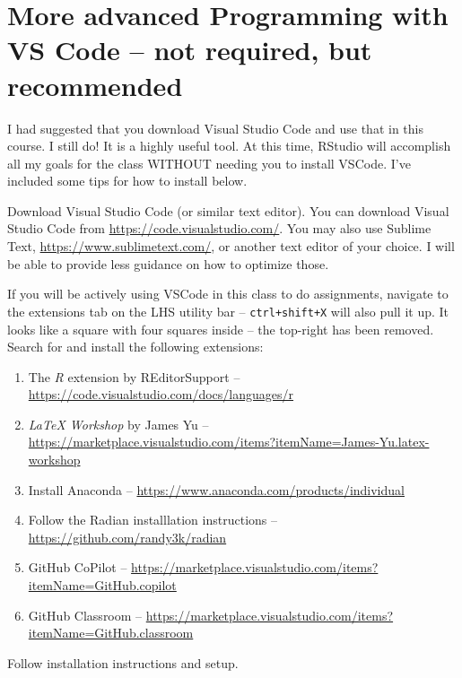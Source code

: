 \documentclass[12pt,english]{exam}
\begin{document}
\section{More advanced Programming with VS Code -- not required, but recommended}

I had suggested that you download Visual Studio Code and use that in this course. I still do! It is a highly useful tool. At this time, RStudio will accomplish all my goals for the class WITHOUT needing you to install VSCode. I've included some tips for how to install below. 

Download Visual Studio Code (or similar text editor). You can download Visual Studio Code from \url{https://code.visualstudio.com/}. You may also use Sublime Text, \url{https://www.sublimetext.com/}, or another text editor of your choice. I will be able to provide less guidance on how to optimize those. 

If you will be actively using VSCode in this class to do assignments, navigate to the extensions tab on the LHS utility bar -- \texttt{ctrl+shift+X} will also pull it up. It looks like a square with four squares inside -- the top-right has been removed. Search for and install the following extensions:

\begin{enumerate}
  \item The \textit{R} extension by REditorSupport -- \url{https://code.visualstudio.com/docs/languages/r}
  \item \textit{LaTeX Workshop} by James Yu -- \url{https://marketplace.visualstudio.com/items?itemName=James-Yu.latex-workshop}
  \item Install Anaconda -- \url{https://www.anaconda.com/products/individual}
  \item Follow the Radian installlation instructions -- \url{https://github.com/randy3k/radian}
  \item GitHub CoPilot -- \url{https://marketplace.visualstudio.com/items?itemName=GitHub.copilot}
  \item GitHub Classroom -- \url{https://marketplace.visualstudio.com/items?itemName=GitHub.classroom}
\end{enumerate}

Follow installation instructions and setup. 
\end{document}
